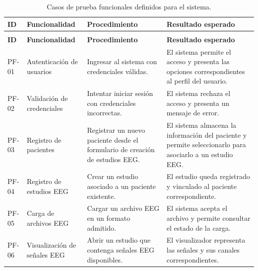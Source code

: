 \begin{longtable}{|
>{\raggedright\arraybackslash}p{}|
>{\raggedright\arraybackslash}p{}|
>{\raggedright\arraybackslash}p{}|
>{\raggedright\arraybackslash}p{}|}


\caption{Casos de prueba funcionales definidos para el sistema.}
\label{tab:casos_pruebas_funcionales}\\
\hline

\textbf{ID} &
\textbf{Funcionalidad} &
\textbf{Procedimiento} &
\textbf{Resultado esperado} \\
\hline
\endfirsthead

\multicolumn{4}{c}{\textit{Continuación del Cuadro \thetable}}\\
\hline
\textbf{ID} &
\textbf{Funcionalidad} &
\textbf{Procedimiento} &
\textbf{Resultado esperado} \\
\hline
\endhead

\hline
\endfoot


PF-01 &
Autenticación de usuarios &
Ingresar al sistema con credenciales válidas. &
El sistema permite el acceso y presenta las opciones correspondientes al perfil del usuario. \\
\hline

PF-02 &
Validación de credenciales &
Intentar iniciar sesión con credenciales incorrectas. &
El sistema rechaza el acceso y presenta un mensaje de error. \\
\hline

PF-03 &
Registro de pacientes &
Registrar un nuevo paciente desde el formulario de creación de estudios EEG. &
El sistema almacena la información del paciente y permite seleccionarlo para asociarlo a un estudio EEG. \\
\hline

PF-04 &
Registro de estudios EEG &
Crear un estudio asociado a un paciente existente. &
El estudio queda registrado y vinculado al paciente correspondiente. \\
\hline

PF-05 &
Carga de archivos EEG &
Cargar un archivo EEG en un formato admitido. &
El sistema acepta el archivo y permite consultar el estado de la carga. \\
\hline

PF-06 &
Visualización de señales EEG &
Abrir un estudio que contenga señales EEG disponibles. &
El visualizador representa las señales y sus canales correspondientes. \\
\hline


\end{longtable}
